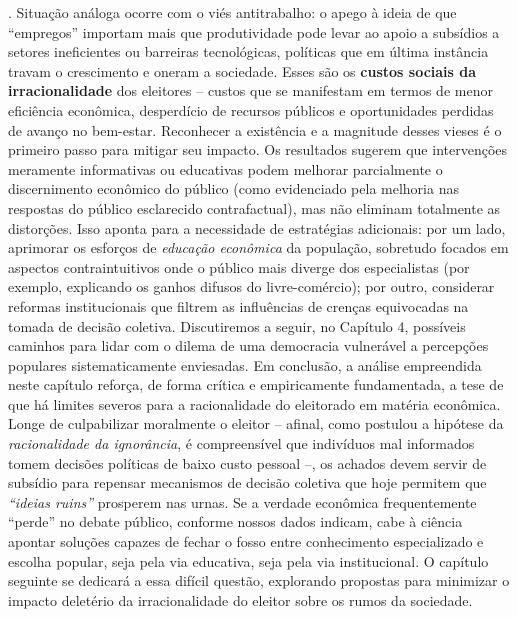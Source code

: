. Situação análoga ocorre com o viés antitrabalho: o apego à ideia de que ``empregos'' importam mais que produtividade pode levar ao apoio a subsídios a setores ineficientes ou barreiras tecnológicas, políticas que em última instância travam o crescimento e oneram a sociedade. Esses são os \textbf{custos sociais da irracionalidade} dos eleitores – custos que se manifestam em termos de menor eficiência econômica, desperdício de recursos públicos e oportunidades perdidas de avanço no bem-estar. Reconhecer a existência e a magnitude desses vieses é o primeiro passo para mitigar seu impacto. Os resultados sugerem que intervenções meramente informativas ou educativas podem melhorar parcialmente o discernimento econômico do público (como evidenciado pela melhoria nas respostas do público esclarecido contrafactual), mas não eliminam totalmente as distorções. Isso aponta para a necessidade de estratégias adicionais: por um lado, aprimorar os esforços de \textit{educação econômica} da população, sobretudo focados em aspectos contraintuitivos onde o público mais diverge dos especialistas (por exemplo, explicando os ganhos difusos do livre-comércio); por outro, considerar reformas institucionais que filtrem as influências de crenças equivocadas na tomada de decisão coletiva. Discutiremos a seguir, no Capítulo 4, possíveis caminhos para lidar com o dilema de uma democracia vulnerável a percepções populares sistematicamente enviesadas. Em conclusão, a análise empreendida neste capítulo reforça, de forma crítica e empiricamente fundamentada, a tese de que há limites severos para a racionalidade do eleitorado em matéria econômica. Longe de culpabilizar moralmente o eleitor -- afinal, como postulou a hipótese da \textit{racionalidade da ignorância}, é compreensível que indivíduos mal informados tomem decisões políticas de baixo custo pessoal --, os achados devem servir de subsídio para repensar mecanismos de decisão coletiva que hoje permitem que \textit{``ideias ruins''} prosperem nas urnas. Se a verdade econômica frequentemente ``perde'' no debate público, conforme nossos dados indicam, cabe à ciência apontar soluções capazes de fechar o fosso entre conhecimento especializado e escolha popular, seja pela via educativa, seja pela via institucional. O capítulo seguinte se dedicará a essa difícil questão, explorando propostas para minimizar o impacto deletério da irracionalidade do eleitor sobre os rumos da sociedade.
